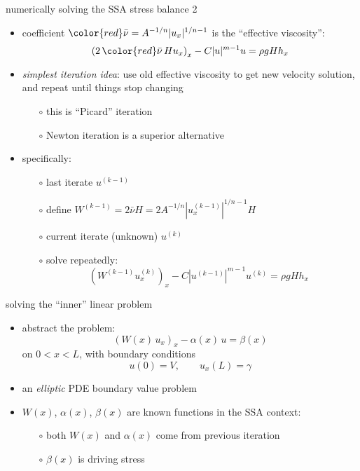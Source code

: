 \begin{frame}{numerically solving the SSA stress balance 2}

\begin{itemize}
\item coefficient ${\color{red} \bar \nu} = A^{-1/n} |u_x|^{1/n-1}$ is the ``effective viscosity'':
   $$\left(2 \,{\color{red} \bar \nu}\, H u_x\right)_x - C |u|^{m-1} u = \rho g H h_x$$
\item \emph{simplest iteration idea}: use old effective viscosity to get new velocity solution, and repeat until things stop changing
  \begin{itemize}
  \item[$\circ$] this is ``Picard'' iteration
  \item[$\circ$] Newton iteration is a superior alternative
  \end{itemize}
\item specifically:
  \begin{itemize}
  \item[$\circ$] last iterate $u^{(k-1)}$
  \item[$\circ$] define $W^{(k-1)} = 2 \bar \nu H = 2 A^{-1/n} |u^{(k-1)}_x|^{1/n-1} H$
  \item[$\circ$] current iterate (unknown) $u^{(k)}$
  \item[$\circ$] solve repeatedly:
     $$\left(W^{(k-1)} u^{(k)}_x\right)_x - C |u^{(k-1)}|^{m-1} u^{(k)} = \rho g H h_x$$
  \end{itemize}
\end{itemize}
\end{frame}


\begin{frame}{solving the ``inner'' linear problem}
\begin{itemize}
\item abstract the problem:
   $$\left(W(x)\, u_x\right)_x - \alpha(x)\, u = \beta(x)$$
on $0 < x < L$, with boundary conditions
   $$u(0) = V, \qquad  u_x(L) = \gamma$$
\item an \emph{elliptic} PDE boundary value problem
\item $W(x)$, $\alpha(x)$, $\beta(x)$ are known functions in the SSA context:
  \begin{itemize}
  \item[$\circ$] both $W(x)$ and $\alpha(x)$ come from previous iteration
  \item[$\circ$] $\beta(x)$ is driving stress
  \end{itemize}
\end{itemize}
\end{frame}


